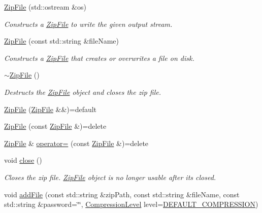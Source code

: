 \begin{DoxyCompactItemize}
\item 
\hyperlink{group___utility_module_gaeb5b4a5bdcfb3401601b79d5b2b8d67f}{Zip\+File} (std\+::ostream \&os)
\begin{DoxyCompactList}\small\item\em Constructs a \hyperlink{classdg_1_1deepcore_1_1_zip_file}{Zip\+File} to write the given output stream. \end{DoxyCompactList}\item 
\hyperlink{group___utility_module_gafa1ff9f05e738574c7ab39179c553a10}{Zip\+File} (const std\+::string \&file\+Name)
\begin{DoxyCompactList}\small\item\em Constructs a \hyperlink{classdg_1_1deepcore_1_1_zip_file}{Zip\+File} that creates or overwrites a file on disk. \end{DoxyCompactList}\item 
\hyperlink{group___utility_module_ga4a3d14bf12cdc92d728b1bee2ef3afbe}{$\sim$\+Zip\+File} ()
\begin{DoxyCompactList}\small\item\em Destructs the \hyperlink{classdg_1_1deepcore_1_1_zip_file}{Zip\+File} object and closes the zip file. \end{DoxyCompactList}\item 
\hyperlink{classdg_1_1deepcore_1_1_zip_file_adf2263875e7094658f836d69056cbcd3}{Zip\+File} (\hyperlink{classdg_1_1deepcore_1_1_zip_file}{Zip\+File} \&\&)=default
\item 
\hyperlink{classdg_1_1deepcore_1_1_zip_file_a5a254be95e73344dd5abfad64aceeab5}{Zip\+File} (const \hyperlink{classdg_1_1deepcore_1_1_zip_file}{Zip\+File} \&)=delete
\item 
\hyperlink{classdg_1_1deepcore_1_1_zip_file}{Zip\+File} \& \hyperlink{classdg_1_1deepcore_1_1_zip_file_ab424ebe12558c54fb848df2fa015d8bd}{operator=} (const \hyperlink{classdg_1_1deepcore_1_1_zip_file}{Zip\+File} \&)=delete
\item 
void \hyperlink{group___utility_module_gab6e19571b30242e6604590e978a932ef}{close} ()
\begin{DoxyCompactList}\small\item\em Closes the zip file. \hyperlink{classdg_1_1deepcore_1_1_zip_file}{Zip\+File} object is no longer usable after it\textquotesingle{}s closed. \end{DoxyCompactList}\item 
void \hyperlink{group___utility_module_gabe05472ab2b9e7af516484c107dafe5a}{add\+File} (const std\+::string \&zip\+Path, const std\+::string \&file\+Name, const std\+::string \&password=\char`\"{}\char`\"{}, \hyperlink{classdg_1_1deepcore_1_1_zip_file_afbf537eaa2281817c203388707564bdd}{Compression\+Level} level=\hyperlink{classdg_1_1deepcore_1_1_zip_file_afbf537eaa2281817c203388707564bdda62b26dddf684026102b91f79a0848012}{D\+E\+F\+A\+U\+L\+T\+\_\+\+C\+O\+M\+P\+R\+E\+S\+S\+I\+ON})

\end{DoxyCompactItemize}
